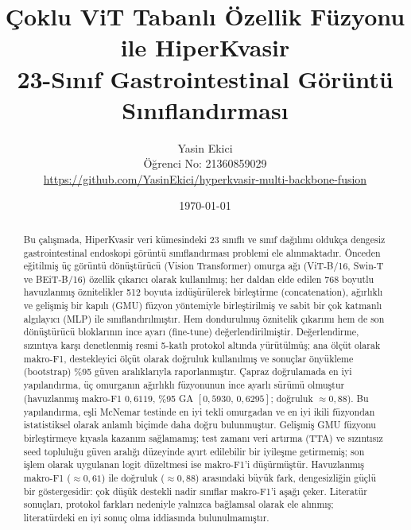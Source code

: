 \documentclass[11pt,a4paper]{article}
\title{Çoklu ViT Tabanlı Özellik Füzyonu ile HiperKvasir\\
       23-Sınıf Gastrointestinal Görüntü Sınıflandırması}
\author{Yasin Ekici \\ Öğrenci No: 21360859029 \\[4pt]
  \small \url{https://github.com/YasinEkici/hyperkvasir-multi-backbone-fusion}}
\date{\today}
\begin{document}
\maketitle

\begin{abstract}
Bu çalışmada, HiperKvasir veri kümesindeki 23 sınıflı ve sınıf dağılımı oldukça
dengesiz gastrointestinal endoskopi görüntü sınıflandırması problemi ele
alınmaktadır. Önceden eğitilmiş üç görüntü dönüştürücü (Vision Transformer)
omurga ağı (ViT-B/16, Swin-T ve BEiT-B/16) özellik çıkarıcı olarak
kullanılmış; her daldan elde edilen 768 boyutlu havuzlanmış öznitelikler 512
boyuta izdüşürülerek birleştirme (concatenation), ağırlıklı ve gelişmiş bir
kapılı (GMU) füzyon yöntemiyle birleştirilmiş ve sabit bir çok katmanlı
algılayıcı (MLP) ile sınıflandırılmıştır. Hem dondurulmuş öznitelik çıkarımı hem
de son dönüştürücü bloklarının ince ayarı (fine-tune) değerlendirilmiştir.
Değerlendirme, sızıntıya karşı denetlenmiş resmi 5-katlı protokol altında
yürütülmüş; ana ölçüt olarak makro-F1, destekleyici ölçüt olarak doğruluk
kullanılmış ve sonuçlar önyükleme (bootstrap) \%95 güven aralıklarıyla
raporlanmıştır. Çapraz doğrulamada en iyi yapılandırma, üç omurganın ağırlıklı
füzyonunun ince ayarlı sürümü olmuştur (havuzlanmış makro-F1 $0{,}6119$, \%95 GA
$[0{,}5930,\,0{,}6295]$; doğruluk $\approx 0{,}88$). Bu yapılandırma, eşli
McNemar testinde en iyi tekli omurgadan ve en iyi ikili füzyondan istatistiksel
olarak anlamlı biçimde daha doğru bulunmuştur. Gelişmiş GMU füzyonu birleştirmeye
kıyasla kazanım sağlamamış; test zamanı veri artırma (TTA) ve sızıntısız seed
topluluğu güven aralığı düzeyinde ayırt edilebilir bir iyileşme getirmemiş; son
işlem olarak uygulanan logit düzeltmesi ise makro-F1'i düşürmüştür. Havuzlanmış
makro-F1 ($\approx 0{,}61$) ile doğruluk ($\approx 0{,}88$) arasındaki büyük
fark, dengesizliğin güçlü bir göstergesidir: çok düşük destekli nadir sınıflar
makro-F1'i aşağı çeker. Literatür sonuçları, protokol farkları nedeniyle yalnızca
bağlamsal olarak ele alınmış; literatürdeki en iyi sonuç olma
iddiasında bulunulmamıştır.
\end{abstract}









\appendix




\end{document}
